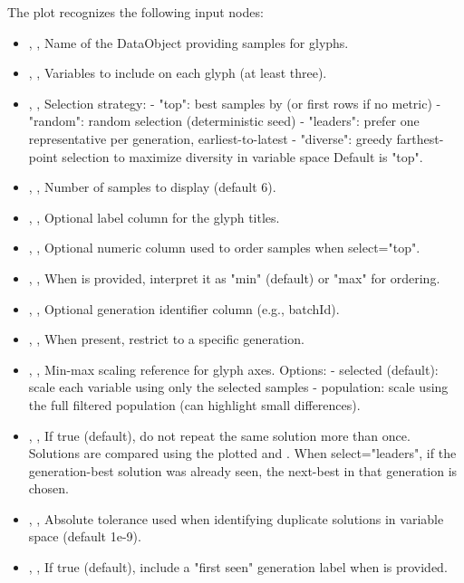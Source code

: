 The  plot recognizes the following input nodes:
\begin{itemize}
  \item {}, , Name of the DataObject providing samples for glyphs.
  \item {}, , Variables to include on each glyph (at least three).
  \item {}, , Selection strategy: - "top": best samples by  (or first rows if no metric) - "random": random selection (deterministic seed) - "leaders": prefer one representative per generation, earliest-to-latest - "diverse": greedy farthest-point selection to maximize diversity in variable space Default is "top".
  \item {}, , Number of samples to display (default 6).
  \item {}, , Optional label column for the glyph titles.
  \item {}, , Optional numeric column used to order samples when select="top".
  \item {}, , When  is provided, interpret it as "min" (default) or "max" for ordering.
  \item {}, , Optional generation identifier column (e.g., batchId).
  \item {}, , When  present, restrict to a specific generation.
  \item {}, , Min-max scaling reference for glyph axes. Options: - selected (default): scale each variable using only the selected samples - population: scale using the full filtered population (can highlight small differences).
  \item {}, , If true (default), do not repeat the same solution more than once. Solutions are compared using the plotted  and . When select="leaders", if the generation-best solution was already seen, the next-best in that generation is chosen.
  \item {}, , Absolute tolerance used when identifying duplicate solutions in variable space (default 1e-9).
  \item {}, , If true (default), include a "first seen" generation label when  is provided.
\end{itemize}

